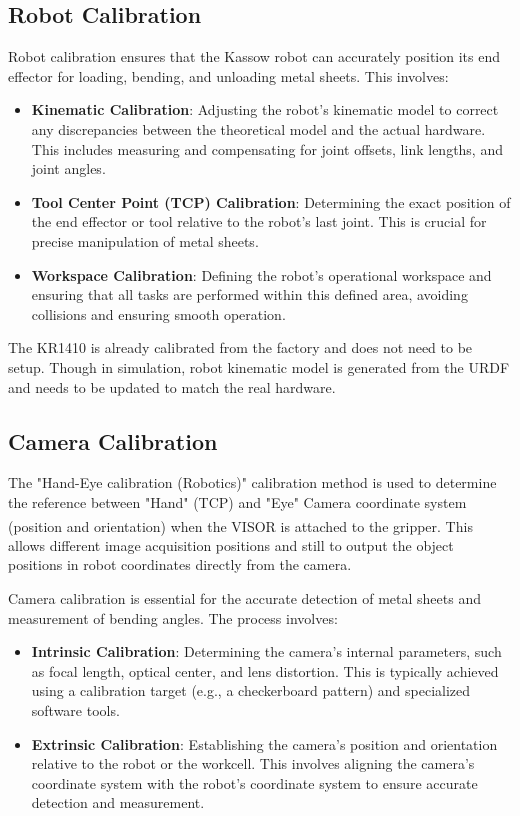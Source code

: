 \subsection{Robot Calibration}
Robot calibration ensures that the Kassow robot can accurately position its end effector for loading, bending, and unloading metal sheets. This involves:


\begin{itemize}
    \item \textbf{Kinematic Calibration}: Adjusting the robot's kinematic model to correct any discrepancies between the theoretical model and the actual hardware. This includes measuring and compensating for joint offsets, link lengths, and joint angles.
    \item \textbf{Tool Center Point (TCP) Calibration}: Determining the exact position of the end effector or tool relative to the robot’s last joint. This is crucial for precise manipulation of metal sheets.
    \item \textbf{Workspace Calibration}: Defining the robot's operational workspace and ensuring that all tasks are performed within this defined area, avoiding collisions and ensuring smooth operation.
\end{itemize}

The KR1410 is already calibrated from the factory and does not need to be setup. Though in simulation, robot kinematic model is generated from the URDF and needs to be updated to match the real hardware.

\subsection{Camera Calibration}
The "Hand-Eye calibration (Robotics)" calibration method is used to determine the
reference between "Hand" (TCP) and "Eye" Camera coordinate system
(position and orientation) when the VISOR\textsuperscript{\textregistered} is attached to the gripper.
This allows different image acquisition positions and still to output the object positions
in robot coordinates directly from the camera.
\cite[page 102]{visor_user_manual}

Camera calibration is essential for the accurate detection of metal sheets and measurement of bending angles. The process involves:

\begin{itemize}
    \item \textbf{Intrinsic Calibration}: Determining the camera's internal parameters, such as focal length, optical center, and lens distortion. This is typically achieved using a calibration target (e.g., a checkerboard pattern) and specialized software tools.
    \item \textbf{Extrinsic Calibration}: Establishing the camera's position and orientation relative to the robot or the workcell. This involves aligning the camera's coordinate system with the robot’s coordinate system to ensure accurate detection and measurement.
\end{itemize}

